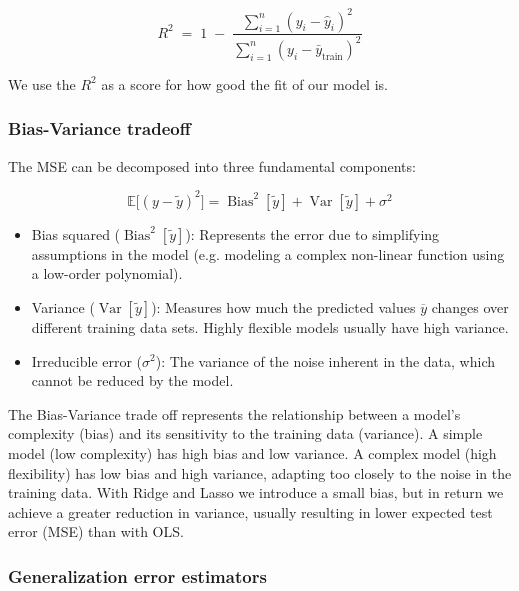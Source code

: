 \documentclass[amssymb,twocolumn,aps]{revtex4}
\begin{document}
\begin{equation}
    R^2 \;=\; 1 \;-\; \frac{\sum_{i=1}^n (y_i - \hat y_i)^2}{\sum_{i=1}^n (y_i - \bar y_{\text{train}})^2}
\end{equation}

We use the $R^2$ as a score for how good the fit of our model is. 

\subsubsection{Bias-Variance tradeoff}

The MSE can be decomposed into three fundamental components: 

\begin{equation}
    \mathbb{E}\!\big[(y-\tilde y)^2\big]
= \operatorname{Bias}^2[\tilde y]
+ \operatorname{Var}[\tilde y]
+ \sigma^2
\end{equation}

\begin{itemize}
    \item Bias squared ($\operatorname{Bias}^2[\tilde y]$): Represents the error due to simplifying assumptions in the model (e.g. modeling a complex non-linear function using a low-order polynomial). 
    \item Variance ($\operatorname{Var}[\tilde y]$): Measures how much the predicted values $\overline{y}$ changes over different training data sets. Highly flexible models usually have high variance. 
    \item Irreducible error ($\sigma^2$): The variance of the noise inherent in the data, which cannot be reduced by the model. 
\end{itemize}

The Bias-Variance trade off represents the relationship between a model's complexity (bias) and its sensitivity to the training data (variance). 
A simple model (low complexity) has high bias and low variance. 
A complex model (high flexibility) has low bias and high variance, adapting too closely to the noise in the training data. With Ridge and Lasso we introduce a small bias, but in return we achieve a greater reduction in variance, usually resulting in lower expected test error (MSE) than with OLS. 

\subsubsection{Generalization error estimators}

\end{document}
